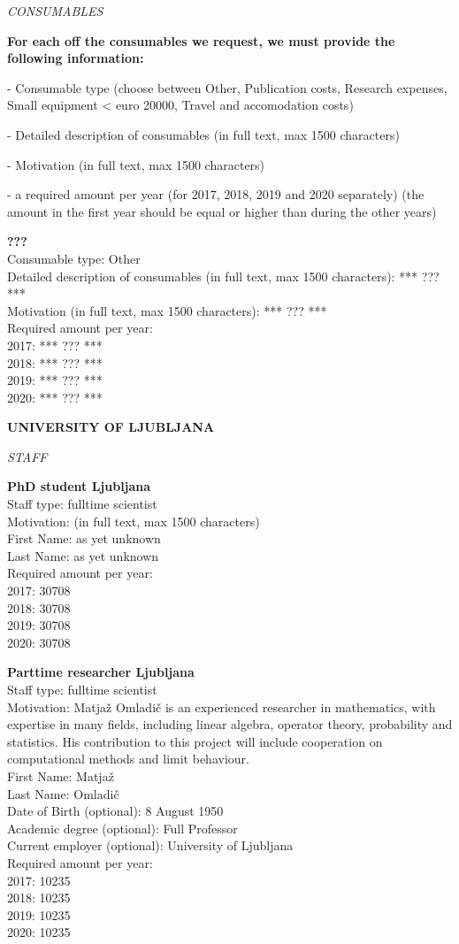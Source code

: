 \documentclass[11pt,dvipsnames,usenames,a4paper]{article}
\begin{document}
{\it CONSUMABLES}

{\bf\color{blue}For each off the consumables we request, we must provide the following information:

- Consumable type (choose between Other, Publication costs, Research expenses, Small equipment < euro 20000, Travel and accomodation costs)

- Detailed description of consumables (in full text, max 1500 characters)

- Motivation (in full text, max 1500 characters)

- a required amount per year (for 2017, 2018, 2019 and 2020 separately) (the amount in the first year should be equal or higher than during the other years)
}

{\bf ???}\\
Consumable type: Other\\
Detailed description of consumables (in full text, max 1500 characters): *** ??? ***\\
Motivation (in full text, max 1500 characters): *** ??? ***\\
Required amount per year:\\
2017: *** ??? ***\\
2018: *** ??? ***\\
2019: *** ??? ***\\
2020: *** ??? ***


{\bf UNIVERSITY OF LJUBLJANA}

{\it STAFF}

\textbf{PhD student Ljubljana} \\
Staff type: fulltime scientist\\
Motivation: (in full text, max 1500 characters)\\
First Name: as yet unknown\\
Last Name: as yet unknown\\
Required amount per year:\\
2017: 30708\\
2018: 30708\\
2019: 30708\\
2020: 30708

\textbf{Parttime researcher Ljubljana}\\
Staff type: fulltime scientist\\
Motivation: Matja\v{z} Omladi\v{c} is an experienced researcher in mathematics, with expertise in many fields, including linear algebra, operator theory, probability and statistics. His contribution to this project will include cooperation on computational methods and limit behaviour.\\
First Name: Matja\v{z}\\
Last Name: Omladi\v{c}\\
Date of Birth (optional): 8 August 1950\\
Academic degree (optional): Full Professor\\
Current employer (optional): University of Ljubljana\\
Required amount per year:\\
2017: 10235\\
2018: 10235\\
2019: 10235\\
2020: 10235
\end{document}
